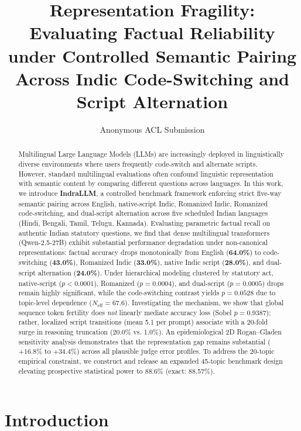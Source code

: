 \documentclass[11pt]{article}
\title{\textbf{Representation Fragility: Evaluating Factual Reliability under Controlled Semantic Pairing Across Indic Code-Switching and Script Alternation}}
\author{Anonymous ACL Submission}
\date{}
\begin{document}
\maketitle

\begin{abstract}
Multilingual Large Language Models (LLMs) are increasingly deployed in linguistically diverse environments where users frequently code-switch and alternate scripts. However, standard multilingual evaluations often confound linguistic representation with semantic content by comparing different questions across languages. In this work, we introduce \textbf{IndraLLM}, a controlled benchmark framework enforcing strict five-way semantic pairing across English, native-script Indic, Romanized Indic, Romanized code-switching, and dual-script alternation across five scheduled Indian languages (Hindi, Bengali, Tamil, Telugu, Kannada). Evaluating parametric factual recall on authentic Indian statutory questions, we find that dense multilingual transformers (Qwen-2.5-27B) exhibit substantial performance degradation under non-canonical representations: factual accuracy drops monotonically from English (\textbf{64.0\%}) to code-switching (\textbf{43.0\%}), Romanized Indic (\textbf{33.0\%}), native Indic script (\textbf{28.0\%}), and dual-script alternation (\textbf{24.0\%}). Under hierarchical modeling clustered by statutory act, native-script ($p < 0.0001$), Romanized ($p = 0.0004$), and dual-script ($p = 0.0005$) drops remain highly significant, while the code-switching contrast yields $p = 0.0528$ due to topic-level dependence ($N_{\text{eff}} = 67.6$). Investigating the mechanism, we show that global sequence token fertility does \textit{not} linearly mediate accuracy loss (Sobel $p = 0.9387$); rather, localized script transitions (mean 5.1 per prompt) associate with a 20-fold surge in reasoning truncation (20.0\% vs. 1.0\%). An epidemiological 2D Rogan--Gladen sensitivity analysis demonstrates that the representation gap remains substantial ($+16.8\%$ to $+34.4\%$) across all plausible judge error profiles. To address the 20-topic empirical constraint, we construct and release an expanded 45-topic benchmark design elevating prospective statistical power to 88.6\% (exact: 88.57\%).
\end{abstract}

\section{Introduction}
\label{sec:intro}
\end{document}
